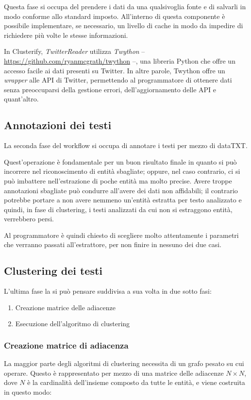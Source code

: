 		Questa fase si occupa del prendere i dati da una qualsivoglia fonte e di salvarli in modo conforme allo standard imposto. All'interno di questa componente è possibile implementare, se necessario, un livello di cache in modo da impedire di richiedere più volte le stesse informazioni.

		In Clusterify, \emph{TwitterReader} utilizza \emph{Twython}  -- \url{https://github.com/ryanmcgrath/twython} --, una libreria Python che offre un accesso facile ai dati presenti su Twitter. In altre parole, Twython offre un \emph{wrapper} alle API di Twitter, permettendo al programmatore di ottenere dati senza preoccuparsi della gestione errori, dell'aggiornamento delle API e quant'altro. 

	\subsection{Annotazioni dei testi}
		La seconda fase del workflow si occupa di annotare i testi per mezzo di dataTXT.
		
		Quest'operazione è fondamentale per un buon risultato finale in quanto si può  incorrere nel riconoscimento di entità sbagliate; oppure, nel caso contrario, ci si può imbattere nell'estrazione di poche entità ma molto precise. Avere troppe annotazioni sbagliate può condurre all'avere dei dati non affidabili; il contrario potrebbe portare a non avere nemmeno un'entità estratta per testo analizzato e quindi, in fase di clustering, i testi analizzati da cui non si estraggono entità, verrebbero persi.

		Al programmatore è quindi chiesto di scegliere molto attentamente i parametri che verranno passati all'estrattore, per non finire in nessuno dei due casi.

	\subsection{Clustering dei testi}
		L'ultima fase la si può pensare suddivisa a sua volta in due sotto fasi:

		\begin{enumerate}
  			\item Creazione matrice delle adiacenze
  			\item Esecuzione dell'algoritmo di clustering
		\end{enumerate} 

		\subsubsection{Creazione matrice di adiacenza}
			La maggior parte degli algoritmi di clustering necessita di un grafo pesato su cui operare. Questo è rappresentato per mezzo di una matrice delle adiacenze $N \times N$, dove $N$ è la cardinalità dell'insieme composto da tutte le entità, e viene costruita in questo modo:

